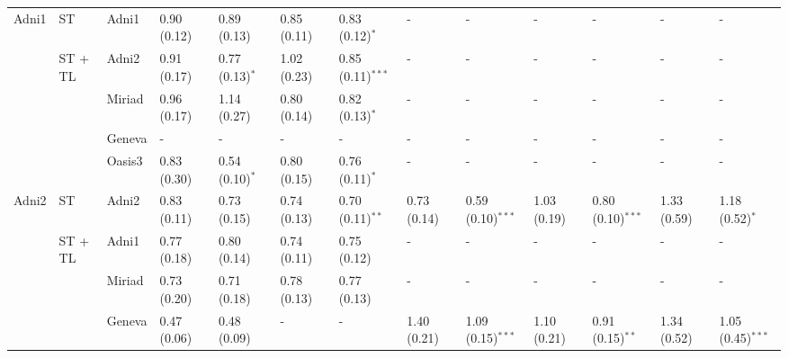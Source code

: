 \begin{table*}
{\begin{tabular}{lllllllllllll}
\cmidrule(lr){1-3}
Adni1  &             ST  & Adni1           &  0.90 (0.12) &  0.89 (0.13)       &  0.85 (0.11) &  0.83 (0.12)$^{*}$   &            - &            -         &            - &            -         &            - &            -         \\
\cmidrule(lr){2-13}
       &        ST + TL  & Adni2           &  0.91 (0.17) &  0.77 (0.13)$^{*}$ &  1.02 (0.23) &  0.85 (0.11)$^{***}$ &            - &            -         &            - &            -         &            - &            -         \\
       &                 & Miriad          &  0.96 (0.17) &  1.14 (0.27)       &  0.80 (0.14) &  0.82 (0.13)$^{*}$   &            - &            -         &            - &            -         &            - &            -         \\
       &                 & Geneva          &            - &            -       &            - &            -         &            - &            -         &            - &            -         &            - &            -         \\
       &                 & Oasis3          &  0.83 (0.30) &  0.54 (0.10)$^{*}$ &  0.80 (0.15) &  0.76 (0.11)$^{*}$   &            - &            -         &            - &            -         &            - &            -         \\
\toprule
Adni2 &             ST   & Adni2            &  0.83 (0.11) &  0.73 (0.15)       &  0.74 (0.13) &  0.70 (0.11)$^{**}$  &  0.73 (0.14) &  0.59 (0.10)$^{***}$ &  1.03 (0.19) &  0.80 (0.10)$^{***}$ &  1.33 (0.59) &  1.18 (0.52)$^{*}$   \\
\cmidrule(lr){2-13}
       &        ST + TL  & Adni1           &  0.77 (0.18) &  0.80 (0.14)       &  0.74 (0.11) &  0.75 (0.12)         &            - &            -         &            - &            -         &            - &            -         \\
       &                 & Miriad          &  0.73 (0.20) &  0.71 (0.18)       &  0.78 (0.13) &  0.77 (0.13)         &            - &            -         &            - &            -         &            - &            -         \\
       &                 & Geneva          &  0.47 (0.06) &  0.48 (0.09)       &            - &            -         &  1.40 (0.21) &  1.09 (0.15)$^{***}$ &  1.10 (0.21) &  0.91 (0.15)$^{**}$  &  1.34 (0.52) &  1.05 (0.45)$^{***}$ \\

\end{tabular}}
\end{table*}
